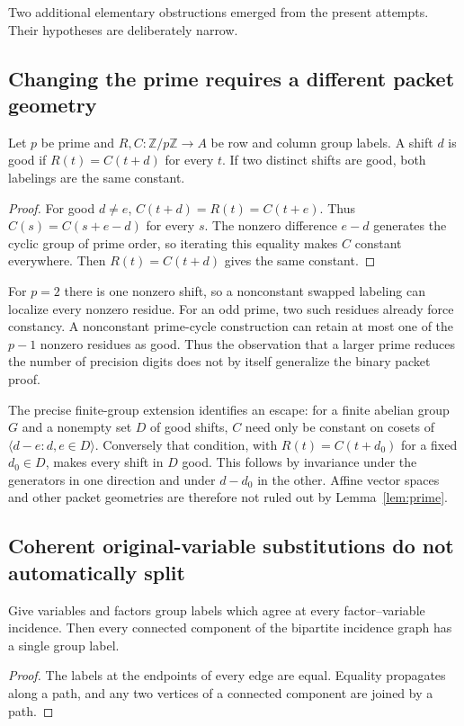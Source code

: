 Two additional elementary obstructions emerged from the present attempts.
Their hypotheses are deliberately narrow.

\subsection{Changing the prime requires a different packet geometry}

\begin{lemma}\label{lem:prime}
Let \(p\) be prime and \(R,C:\mathbb Z/p\mathbb Z\to A\) be row and
column group labels. A shift \(d\) is good if
\(R(t)=C(t+d)\) for every \(t\).
If two distinct shifts are good, both labelings are the same constant.
\end{lemma}
\begin{proof}
For good \(d\ne e\),
\(C(t+d)=R(t)=C(t+e)\).
Thus \(C(s)=C(s+e-d)\) for every \(s\).
The nonzero difference \(e-d\) generates the cyclic group of prime
order, so iterating this equality makes \(C\) constant everywhere.
Then \(R(t)=C(t+d)\) gives the same constant.
\end{proof}

For \(p=2\) there is one nonzero shift, so a nonconstant swapped labeling
can localize every nonzero residue. For an odd prime, two such residues
already force constancy. A nonconstant prime-cycle construction can retain
at most one of the \(p-1\) nonzero residues as good.
Thus the observation that a larger prime reduces the number of precision
digits does not by itself generalize the binary packet proof.

The precise finite-group extension identifies an escape: for a finite
abelian group \(G\) and a nonempty set \(D\) of good shifts, \(C\) need only
be constant on cosets of
\(\langle d-e:d,e\in D\rangle\).
Conversely that condition, with \(R(t)=C(t+d_0)\) for a fixed \(d_0\in D\),
makes every shift in \(D\) good. This follows by invariance under the
generators in one direction and under \(d-d_0\) in the other.
Affine vector spaces and other packet geometries are therefore not ruled
out by Lemma~\ref{lem:prime}.

\subsection{Coherent original-variable substitutions do not automatically split}

\begin{lemma}\label{lem:coherence}
Give variables and factors group labels which agree at every
factor--variable incidence. Then every connected component of the
bipartite incidence graph has a single group label.
\end{lemma}
\begin{proof}
The labels at the endpoints of every edge are equal. Equality propagates
along a path, and any two vertices of a connected component are joined
by a path.
\end{proof}

